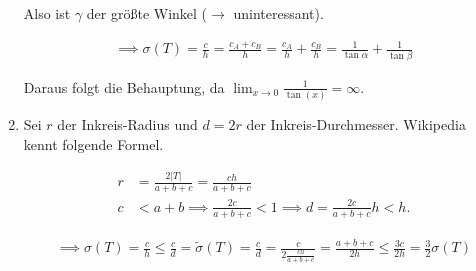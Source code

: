 \begin{solution}
\begin{enumerate}[label = \textbf{\alph*)}]
    Also ist $\gamma$ der größte Winkel ($\to$ uninteressant).

    \begin{align*}
      \implies
      \sigma(T)
      =
      \frac{c}{h}
      =
      \frac{c_A + c_B}{h}
      =
      \frac{c_A}{h} + \frac{c_B}{h}
      =
      \frac{1}{\tan \alpha} + \frac{1}{\tan \beta}
    \end{align*}

    Daraus folgt die Behauptung, da $\lim_{x \to 0}\frac{1}{\tan(x)} = \infty$.

    \item Sei $r$ der Inkreis-Radius und $d = 2r$ der Inkreis-Durchmesser.
    Wikipedia kennt folgende Formel.

    \begin{align*}
      r &= \frac{2 |T|}{a + b + c} = \frac{ch}{a + b + c} \\
      c &< a +b \implies \frac{2c}{a+b+c} < 1 \implies d = \frac{2c}{a+b+c}h < h.
    \end{align*}

    \begin{align*}
      \implies
      \sigma(T)
      =
      \frac{c}{h}
      \leq
      \frac{c}{d}
      =
      \tilde{\sigma}(T)
      =
      \frac{c}{d}
      =
      \frac{c}
      {
        2 \frac{ch}{a + b + c}
      }
      =
      \frac{a + b + c}{2h}
      \leq
      \frac{3c}{2h}
      =
      \frac{3}{2} \sigma(T)
    \end{align*}

  \end{enumerate}

  \end{solution}

